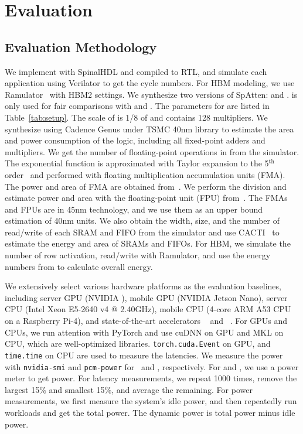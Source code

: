 

\section{Evaluation}
\subsection{Evaluation Methodology}
\label{sec:evalmethod}
We implement \name with SpinalHDL and compiled to RTL, and simulate each application using Verilator to get the cycle numbers. For HBM modeling, we use Ramulator~\cite{kim2015ramulator} with HBM2 settings. We synthesize two versions of SpAtten: {\spattenfull} and \spattensmall. {\spattensmall} is only used for fair comparisons with \mnnfast and \athree. The parameters for {\spattenfull} are listed in Table~\ref{tab:setup}. The scale of {\spattensmall} is 1/8 of {\spattenfull} and contains 128 multipliers.
We synthesize \name using Cadence Genus under TSMC 40nm library to estimate the area and power consumption of the logic, including all fixed-point adders and multipliers. We get the number of floating-point operations in \softmax from the simulator. The exponential function is approximated with Taylor expansion to the 5$^{\mathrm{th}}$ order~\cite{7004740} and performed with floating multiplication accumulation units (FMA). The power and area of FMA are obtained from~\cite{salehi2015energy}. We perform the division and estimate power and area with the floating-point unit (FPU) from~\cite{salehi2015energy}. The FMAs and FPUs are in 45nm technology, and we use them as an upper bound estimation of 40nm units. 
We also obtain the width, size, and the number of read/write of each SRAM and FIFO from the simulator and use CACTI~\cite{cacti} to estimate the energy and area of SRAMs and FIFOs. For HBM, we simulate the number of row activation, read/write with Ramulator, and use the energy numbers from \cite{o2017fine} to calculate overall energy. 

We extensively select various hardware platforms as the evaluation baselines, including server GPU (NVIDIA \titanxp), mobile GPU (NVIDIA Jetson Nano), server CPU (Intel Xeon E5-2640 v4 @ 2.40GHz), mobile CPU (4-core ARM A53 CPU on a Raspberry Pi-4), and state-of-the-art accelerators \athree~\cite{ham20203} and \mnnfast~\cite{8980322}. For GPUs and CPUs, we run attention with PyTorch and use cuDNN on GPU and MKL on CPU, which are well-optimized libraries.
\texttt{torch.cuda.Event} on GPU, and \texttt{time.time} on CPU are used to measure the latencies. We measure the power with \texttt{nvidia-smi} and \texttt{pcm-power} for \titanxp \ and \xeon, respectively. For \nano \xspace and \rasp, we use a power meter to get power. For latency measurements, we repeat 1000 times, remove the largest 15\% and smallest 15\%, and average the remaining. For power measurements, we first measure the system's idle power, and then repeatedly run workloads and get the total power. The dynamic power is total power minus idle power. 

